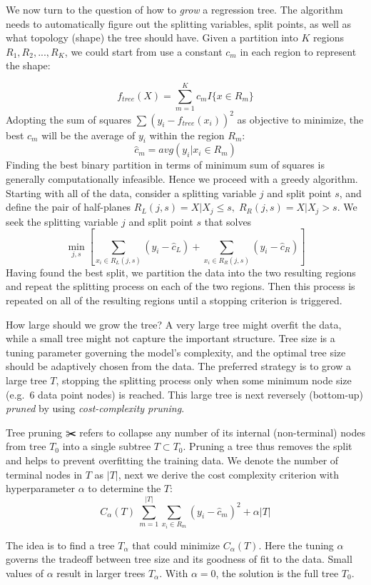 \documentclass[
]{book}
\begin{document}
We now turn to the question of how to {\emph{grow}} a regression tree. The algorithm needs to automatically figure out the splitting variables, split points, as well as what topology (shape) the tree should have. Given a partition into \(K\) regions \(R_1, R_2,...,R_K\), we could start from use a constant \(c_m\) in each region to represent the shape:

\[
f_{tree} (X) = \sum_{m=1}^K c_m I\{ x \in R_m \} 
\]
Adopting the sum of squares \(\sum(y_i - f_{tree}(x_i))^2\) as objective to minimize, the best \(c_m\) will be the average of \(y_i\) within the region \(R_m\):
\[
\hat{c}_m = avg(y_i | x_i \in R_m)
\]
Finding the best binary partition in terms of minimum sum of squares is generally computationally infeasible. Hence we proceed with a greedy algorithm. Starting with all of the data, consider a splitting variable \(j\) and split point \(s\), and define the pair of half-planes \(R_{L}(j,s)={X|X_j \leq s},\; R_{R}(j,s)={X|X_j > s}\). We seek the splitting variable \(j\) and split point \(s\) that solves
\[
\min_{j,s}  [ \sum_{x_i \in R_{L}(j,s)} (y_i - \hat{c}_L) + \sum_{x_i \in R_{R}(j,s)} (y_i - \hat{c}_R)]
\]
Having found the best split, we partition the data into the two resulting regions and repeat the splitting process on each of the two regions. Then this process is repeated on all of the resulting regions until a stopping criterion is triggered.

How large should we grow the tree? A very large tree might overfit the data, while a small tree might not capture the important structure. Tree size is a tuning parameter governing the model's complexity, and the optimal tree size should be adaptively chosen from the data. The preferred strategy is to grow a large tree \(T\), stopping the splitting process only when some minimum node size (e.g.~6 data point nodes) is reached. This large tree is next reversely (bottom-up) {\emph{pruned}} by using \emph{cost-complexity pruning}.

Tree pruning ✂️ refers to collapse any number of its internal (non-terminal) nodes from tree \(T_0\) into a single subtree \(T \subset T_0\). Pruning a tree thus removes the split and helps to prevent overfitting the training data. We denote the number of terminal nodes in \(T\) as \(|T|\), next we derive the cost complexity criterion with hyperparameter \(\alpha\) to determine the \(T\):
\[
C_\alpha (T) \ \sum_{m=1}^{|T|}  \sum_{x_i \in R_m}(y_i - \hat{c}_m)^2 + \alpha |T|
\]

The idea is to find a tree \(T_{\alpha}\) that could minimize \(C_\alpha (T)\). Here the tuning \(\alpha\) governs the tradeoff between tree size and its goodness of fit to the data. Small values of \(\alpha\) result in larger trees \(T_{\alpha}\). With \(\alpha=0\), the solution is the full tree \(T_0\).
\end{document}
